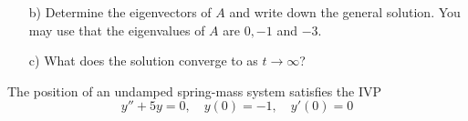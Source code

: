 \documentclass[12pt]{exam}
\begin{document}
\begin{questions}
\begin{enumerate}
                \item[b)] Determine the eigenvectors of $A$ and write down the general solution. You may use that the eigenvalues of $A$ are $0, -1$ and $-3$. 
                \vspace{10cm} 
                \item[c)] What does the solution converge to as $t \to \infty$? 
        \end{enumerate}
        
    \newpage \InitialsRight
    \Scratch 
        
        
    \newpage \InitialsLeft
        
    \question[10] The position of an undamped spring-mass system satisfies the IVP $$y'' + 5y = 0, \quad y(0) = -1, \quad y'(0) = 0$$  
        
    
\end{questions}
    
\newpage \InitialsRight
\Scratch

\newpage \InitialsLeft \\ \LastPage 
\newpage \InitialsRight \\ \LastPage 
\end{document}
